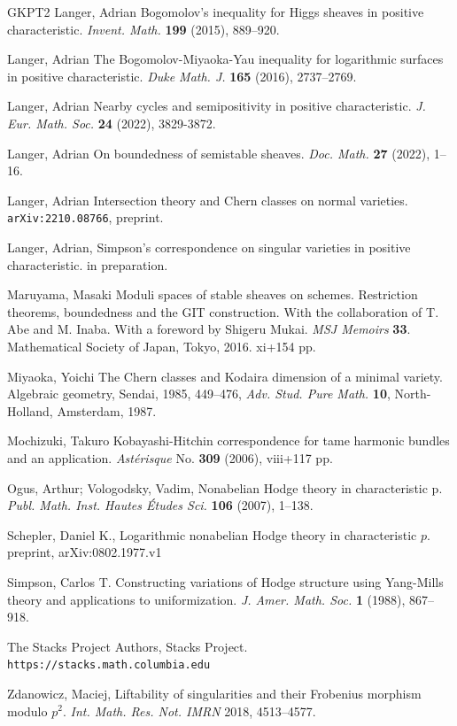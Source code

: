\documentclass[12pt]{article}
\theoremstyle{plain}
\theoremstyle{definition}
\theoremstyle{remark}
\begin{document}
\begin{thebibliography}{GKPT2}
 Langer, Adrian Bogomolov's inequality for Higgs
  sheaves in positive characteristic.  \emph{Invent. Math.} {\bf 199}
  (2015), 889--920.

 Langer, Adrian The Bogomolov-Miyaoka-Yau
  inequality for logarithmic surfaces in positive characteristic. 
\emph{Duke Math. J.} {\bf 165} (2016), 2737--2769.


 Langer, Adrian Nearby cycles and semipositivity in positive characteristic.
\emph{J. Eur. Math. Soc.} {\bf 24} (2022), 3829-3872.

  Langer, Adrian On boundedness of semistable sheaves. \emph{Doc. Math.} {\bf 27} (2022), 1--16.

 Langer, Adrian Intersection theory and Chern classes on normal varieties. {\tt arXiv:2210.08766}, preprint.
	

 Langer, Adrian, Simpson's correspondence on singular varieties in positive characteristic. in preparation.
	
 Maruyama, Masaki Moduli spaces of stable sheaves on schemes. Restriction theorems, boundedness and the GIT construction. With the collaboration of T. Abe and M. Inaba. With a foreword by Shigeru Mukai. \emph{MSJ Memoirs} {\bf 33}. Mathematical Society of Japan, Tokyo, 2016. xi+154 pp.

 Miyaoka, Yoichi The Chern classes and Kodaira dimension of a minimal variety. Algebraic geometry, Sendai, 1985, 449--476, \emph{Adv. Stud. Pure Math.} {\bf 10}, North-Holland, Amsterdam, 1987.

 Mochizuki, Takuro 
Kobayashi-Hitchin correspondence for tame harmonic bundles and an application. 
\emph{Ast\'erisque} No. {\bf 309} (2006), viii+117 pp.

 Ogus, Arthur; Vologodsky, Vadim, Nonabelian Hodge
  theory in characteristic p. \emph{Publ. Math. Inst. Hautes \'Etudes
    Sci.} {\bf 106} (2007), 1--138.

  Schepler, Daniel K., Logarithmic nonabelian Hodge theory in
  characteristic $p$. preprint, arXiv:0802.1977.v1


 Simpson, Carlos T. Constructing variations of Hodge structure using Yang-Mills theory and applications to uniformization. \emph{J. Amer. Math. Soc.} {\bf 1} (1988), 867--918.

   {The {Stacks Project Authors}}, Stacks Project. {\tt https://stacks.math.columbia.edu}
  
  Zdanowicz, Maciej, Liftability of singularities and their Frobenius morphism modulo 
$p^2$. \emph{Int. Math. Res. Not. IMRN} 2018, 4513--4577.
 

\end{thebibliography}
\end{document}
